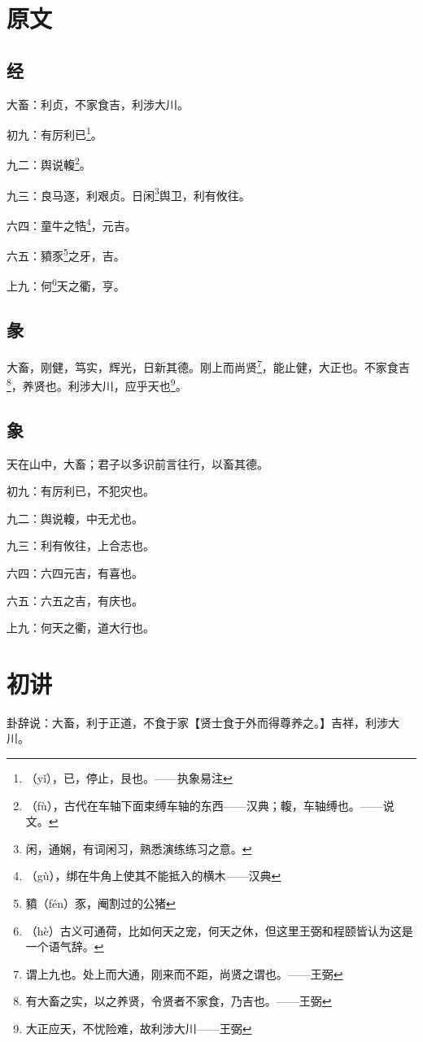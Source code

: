 \documentclass[12pt,oneside]{book}
\begin{document}
\section{原文}

\subsection{经}
大畜：利贞，不家食吉，利涉大川。

初九：有厉利已\footnote{（yǐ），已，停止，艮也。——执象易注}。

九二：舆说輹\footnote{（fù），古代在车轴下面束缚车轴的东西——汉典；輹，车轴缚也。——说文。}。

九三：良马逐，利艰贞。日闲\footnote{闲，通娴，有词闲习，熟悉演练练习之意。}舆卫，利有攸往。

六四：童牛之牿\footnote{（gù），绑在牛角上使其不能抵入的横木——汉典}，元吉。

六五：豶豕\footnote{豶（fén）豕，阉割过的公猪}之牙，吉。

上九：何\footnote{（hè）古义可通荷，比如何天之宠，何天之休，但这里王弼和程颐皆认为这是一个语气辞。}天之衢，亨。

\subsection{彖}
大畜，刚健，笃实，辉光，日新其德。刚上而尚贤\footnote{谓上九也。处上而大通，刚来而不距，尚贤之谓也。——王弼}，能止健，大正也。不家食吉\footnote{有大畜之实，以之养贤，令贤者不家食，乃吉也。——王弼}，养贤也。利涉大川，应乎天也\footnote{大正应天，不忧险难，故利涉大川——王弼}。

\subsection{象}
天在山中，大畜；君子以多识前言往行，以畜其德。

初九：有厉利已，不犯灾也。

九二：舆说輹，中无尤也。

九三：利有攸往，上合志也。

六四：六四元吉，有喜也。

六五：六五之吉，有庆也。

上九：何天之衢，道大行也。

\section{初讲}
卦辞说：大畜，利于正道，不食于家【贤士食于外而得尊养之。】吉祥，利涉大川。
\end{document}
